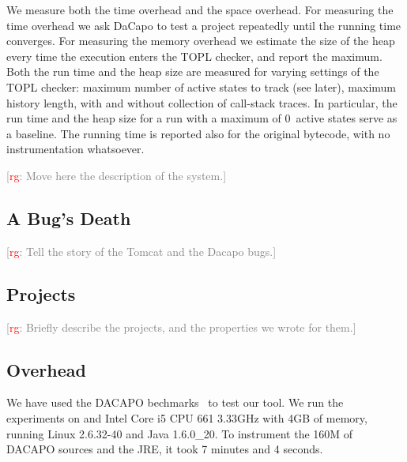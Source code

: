 \documentclass{sigplanconf}[10pt] %
\newcommand{\noterg}[2]{\textcolor{gray}{[\textcolor{red}{#1}: #2]}}
\newcommand{\rg}[1]{\noterg{rg}{#1}}
\begin{document}
We measure both the time overhead and the space overhead.
For measuring the time overhead we ask DaCapo to test a project repeatedly until the running time converges.
For measuring the memory overhead we estimate the size of the heap every time the execution enters the TOPL checker, and report the maximum.
Both the run time and the heap size are measured for varying settings of the TOPL checker: maximum number of active states to track (see later), maximum history length, with and without collection of call-stack traces.
In particular, the run time and the heap size for a run with a maximum of $0$~active states serve as a baseline.
The running time is reported also for the original bytecode, with no instrumentation whatsoever.

\rg{Move here the description of the system.}

\subsection{A Bug's Death} %

\rg{Tell the story of the Tomcat and the Dacapo bugs.}

\subsection{Projects} %

\rg{Briefly describe the projects, and the properties we wrote for them.}

\subsection{Overhead} %

We have used the DACAPO bechmarks~\cite{dblp:conf/oopsla/dacapo} to test our tool.
We run the experiments on and Intel  Core i5 CPU  661  \@ 3.33GHz with 4GB of memory, running
 Linux 2.6.32-40 and  Java 1.6.0\_20.
To instrument the 160M of DACAPO sources and the JRE, it took  7 minutes and 4 seconds.
\end{document}
